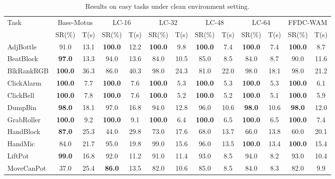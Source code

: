 \documentclass{article}
\begin{document}
\begin{table}[t]
\renewcommand{\arraystretch}{1}
\centering
\setlength{\tabcolsep}{1.5pt}
\caption{Results on easy tasks under clean environment setting.}
\label{tab:easy_clean_results}
\begin{tabular}{@{}lcccccccccccc@{}}
\toprule
\multirow{2}{*}{Task}
& \multicolumn{2}{c}{Base-Motus}
& \multicolumn{2}{c}{LC-16}
& \multicolumn{2}{c}{LC-32}
& \multicolumn{2}{c}{LC-48}
& \multicolumn{2}{c}{LC-64}
& \multicolumn{2}{c}{FFDC-WAM} \\
\cmidrule(lr){2-3}
\cmidrule(lr){4-5}
\cmidrule(lr){6-7}
\cmidrule(lr){8-9}
\cmidrule(lr){10-11}
\cmidrule(lr){12-13}
& SR(\%) & T(s)
& SR(\%) & T(s)
& SR(\%) & T(s)
& SR(\%) & T(s)
& SR(\%) & T(s)
& SR(\%) & T(s) \\
\midrule
AdjBottle      & 91.0 & 13.1 & \textbf{100.0} & 12.2 & \textbf{100.0} & 9.8 & \textbf{100.0} & 7.4 & \textbf{100.0} & 7.4 & \textbf{100.0} & 8.7 \\
BeatBlock      & \textbf{97.0} & 13.3 & 94.0 & 13.6 & 84.0 & 10.5 & 85.0 & 8.5 & 84.0 & 8.7 & 90.0 & 11.6 \\
BlkRankRGB     & \textbf{100.0} & 36.3 & 86.0 & 40.3 & 98.0 & 24.3 & 81.0 & 22.0 & 98.0 & 18.1 & 98.0 & 21.2 \\
ClickAlarm     & \textbf{100.0} & 7.7 & \textbf{100.0} & 7.6 & \textbf{100.0} & 5.3 & \textbf{100.0} & 5.3 & \textbf{100.0} & 5.3 & \textbf{100.0} & 6.1 \\
ClickBell      & \textbf{100.0} & 7.8 & \textbf{100.0} & 7.6 & \textbf{100.0} & 5.2 & \textbf{100.0} & 5.2 & \textbf{100.0} & 5.1 & \textbf{100.0} & 5.9 \\
DumpBin        & \textbf{98.0} & 18.1 & 97.0 & 16.8 & 94.0 & 12.8 & 96.0 & 10.6 & \textbf{98.0} & 10.6 & \textbf{98.0} & 12.0 \\
GrabRoller     & \textbf{100.0} & 9.2 & \textbf{100.0} & 9.1 & \textbf{100.0} & 6.4 & \textbf{100.0} & 6.5 & \textbf{100.0} & 6.5 & \textbf{100.0} & 7.4 \\
HandBlock      & \textbf{87.0} & 25.3 & 44.0 & 29.8 & 73.0 & 17.6 & 68.0 & 13.7 & 66.0 & 13.8 & 60.0 & 20.1 \\
HandMic        & 84.0 & 21.7 & 95.0 & 19.8 & 99.0 & 15.6 & 96.0 & 13.5 & \textbf{100.0} & 13.4 & \textbf{100.0} & 15.4 \\
LiftPot        & \textbf{99.0} & 16.8 & 92.0 & 11.2 & 91.0 & 11.4 & 93.0 & 8.5 & 94.0 & 8.2 & 93.0 & 10.4 \\
MoveCanPot     & 37.0 & 25.4 & \textbf{86.0} & 13.5 & 82.0 & 10.6 & 85.0 & 8.5 & 84.0 & 8.3 & 82.0 & 9.9 \\

\end{tabular}
\end{table}
\end{document}
